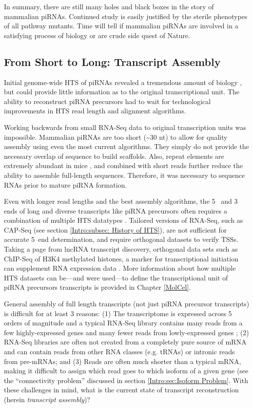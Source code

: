 {    In summary, there are still many holes and black boxes in the story of mammalian piRNAs. Continued study is easily justified by the sterile phenotypes of all pathway mutants. Time will tell if mammalian piRNAs are involved in a satisfying process of biology or are crude side quest of Nature.


  \subsection{From Short to Long: Transcript Assembly}
    \label{Intro:subsec:Tx Assembly}

    Initial genome-wide HTS of piRNAs revealed a tremendous amount of biology \citep{Gunawardane2007,Brennecke2007}, but could provide little information as to the original transcriptional unit. The ability to reconstruct piRNA precursors had to wait for technological improvements in HTS read length and alignment algorithms.

    Working backwards from small RNA-Seq data to original transcription units was impossible. Mammalian piRNAs are too short (\textasciitilde30 nt) to allow for quality assembly using even the most current algorithms. They simply do not provide the necessary overlap of sequence to build scaffolds. Also, repeat elements are extremely abundant in mice \citep{Nellaker2012}, and combined with short reads further reduce the ability to assemble full-length sequences. Therefore, it was necessary to sequence RNAs prior to mature piRNA formation.

    Even with longer read lengths and the best assembly algorithms, the 5\textprime~ and 3\textprime~ ends of long and diverse transcripts like piRNA precursors often requires a combination of multiple HTS datatypes \citep{Blower2013,Li2013e}. Tailored versions of RNA-Seq, such as CAP-Seq (see section \ref{Intro:subsec: History of HTS}), are not sufficient for accurate 5\textprime~end determination, and require orthogonal datasets to verify TSSs. Taking a page from lncRNA transcript discovery, orthogonal data sets such as ChIP-Seq of H3K4 methylated histones, a marker for transcriptional initiation can supplement RNA expression data \citep{Khalil2009}. More information about how multiple HTS datasets can be---and were used---to define the transcriptional unit of piRNA precursors transcripts is provided in Chapter \ref{MolCel}.

    General assembly of full length transcripts (not just piRNA precursor transcripts) is difficult for at least 3 reasons: (1) The transcriptome is expressed across 5 orders of magnitude and a typical RNA-Seq library contains many reads from a few highly-expressed genes and many fewer reads from lowly-expressed genes \citep{Blencowe2009}; (2) RNA-Seq libraries are often not created from a completely pure source of mRNA and can contain reads from other RNA classes (e.g. tRNAs) or intronic reads from pre-mRNAs; and (3) Reads are often much shorter than a typical mRNA, making it difficult to assign which read goes to which isoform of a given gene (see the ``connectivity problem'' discussed in section \ref{Intro:sec:Isoform Problem}. With these challenges in mind, what is the current state of transcript reconstruction (herein \textit{transcript assembly})?

}
